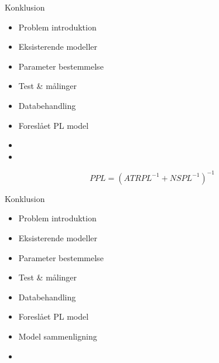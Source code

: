 \begin{frame}{Konklusion}
	\begin{minipage}{0.5\textwidth}
		\begin{itemize}
		\item Problem introduktion
		\item Eksisterende modeller
		\item Parameter bestemmelse
		\item Test \& målinger
		\item Databehandling
		\item Foreslået PL model
		\item[] 
		\item[] 
		\end{itemize}
	\end{minipage}%
	\begin{minipage}{0.5\textwidth}
		\begin{equation*}
		PPL = \left(ATRPL^{-1} + NSPL^{-1}\right)^{-1} 
		\end{equation*}
	\end{minipage}%
\end{frame}

\begin{frame}{Konklusion}
	\begin{minipage}{0.5\textwidth}
		\begin{itemize}
		\item Problem introduktion
		\item Eksisterende modeller
		\item Parameter bestemmelse
		\item Test \& målinger
		\item Databehandling
		\item Foreslået PL model
		\item Model sammenligning
		\item[] 
		\end{itemize}
	\end{minipage}%
	\begin{minipage}{0.5\textwidth}
	\end{minipage}%
\end{frame}

